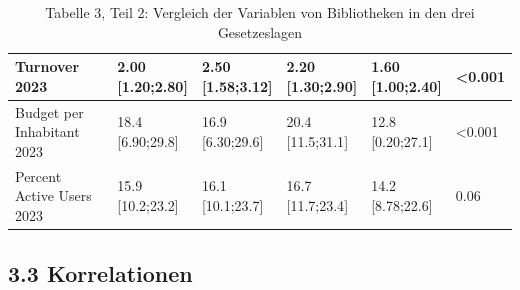 \documentclass[a4paper,
fontsize=11pt,
oneside,
numbers=noperiodatend,
parskip=half-,
bibliography=totoc,
final
]{scrartcl}
\begin{document}
\begin{landscape}
\begin{table}[]
\begin{tabular}{|l|l|l|l|l|l|}
Turnover 2023                    & \makecell{2.00 \\ {[}1.20;2.80{]}}     & \makecell{2.50 \\ {[}1.58;3.12{]}}     & \makecell{2.20 \\ {[}1.30;2.90{]}}     & \makecell{1.60 \\ {[}1.00;2.40{]}}   & \textless{}0.001   \\ \hline
Budget per Inhabitant 2023       & \makecell{18.4 \\ {[}6.90;29.8{]}}     & \makecell{16.9 \\ {[}6.30;29.6{]}}     & \makecell{20.4 \\ {[}11.5;31.1{]}}     & \makecell{12.8 \\ {[}0.20;27.1{]}}   & \textless{}0.001   \\ \hline
Percent Active Users 2023        & \makecell{15.9 \\ {[}10.2;23.2{]}}     & \makecell{16.1 \\ {[}10.1;23.7{]}}     & \makecell{16.7 \\ {[}11.7;23.4{]}}     & \makecell{14.2 \\ {[}8.78;22.6{]}}   & 0.06               \\ \hline
\end{tabular}
\caption{Tabelle 3, Teil 2: Vergleich der Variablen von Bibliotheken in den drei Gesetzeslagen}
\end{table}
\end{landscape}


\subsection{3.3 Korrelationen}\label{korrelationen}
\end{document}
